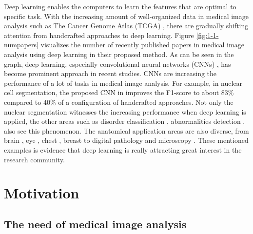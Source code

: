 Deep learning enables the computers to learn the features that are optimal to specific task. With the increasing amount of well-organized data in medical image analysis such as The Cancer Genome Atlas (TCGA) \cite{tcga}, there are gradually shifting attention from handcrafted approaches to deep learning. Figure \ref{fig:1-1-numpapers} visualizes the number of recently published papers in medical image analysis using deep learning in their proposed method. As can be seen in the graph, deep learning, especially convolutional neural networks (CNNs) \cite{AlexNet}, has become prominent approach in recent studies. CNNs are increasing the performance of a lot of tasks in medical image analysis. For example, in nuclear cell segmentation, the proposed CNN in \cite{he_dataset_kumar} improves the F1-score to about 83\% compared to 40\% of a configuration of handcrafted approaches. Not only the nuclear segmentation witnesses the increasing performance when deep learning is applied, the other areas such as disorder classification \cite{disorder1, disorder2}, abnormalities detection \cite{abnormality1, abnormality2}, also see this phenomenon. The anatomical application areas are also diverse, from brain \cite{brain}, eye \cite{eyes1, abnormality1}, chest \cite{chest1}, breast \cite{breast1} to digital pathology and microscopy \cite{he_dataset_kumar}. These mentioned examples is evidence that deep learning is really attracting great interest in the research community. 

\section{Motivation}

\subsection{The need of medical image analysis}

